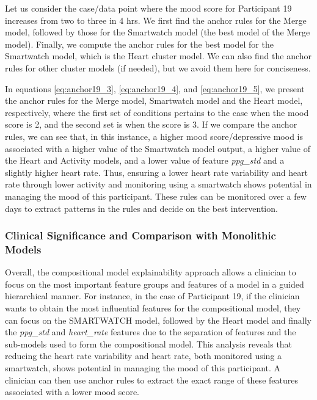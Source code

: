Let us consider the case/data point where the mood score for Participant 19 increases from two to three in 4 hrs. We first find the anchor rules for the Merge model, followed by those for the Smartwatch model (the best model of the Merge model). Finally, we compute the anchor rules for the best model for the Smartwatch model, which is the Heart cluster model. We can also find the anchor rules for other cluster models (if needed), but we avoid them here for conciseness. 

In equations \ref{eq:anchor19_3}, \ref{eq:anchor19_4}, and \ref{eq:anchor19_5}, we present the anchor rules for the Merge model, Smartwatch model and the Heart model, respectively, where the first set of conditions pertains to the case when the mood score is 2, and the second set is when the score is 3. If we compare the anchor rules, we can see that, in this instance, a higher mood score/depressive mood is associated with a higher value of the Smartwatch model output, a higher value of the Heart and Activity models, and a lower value of feature \emph{ppg\_std} and a slightly higher heart rate. Thus, ensuring a lower heart rate variability and heart rate through lower activity and monitoring using a smartwatch shows potential in managing the mood of this participant. These rules can be monitored over a few days to extract patterns in the rules and decide on the best intervention.


\subsubsection{Clinical Significance and Comparison with Monolithic Models}

Overall, the compositional model explainability approach allows a clinician to focus on the most important feature groups and features of a model in a guided hierarchical manner. For instance, in the case of Participant 19, if the clinician wants to obtain the most influential features for the compositional model, they can focus on the SMARTWATCH model, followed by the Heart model and finally the \emph{ppg\_std} and \emph{heart\_rate} features due to the separation of features and the sub-models used to form the compositional model. This analysis reveals that reducing the heart rate variability and heart rate, both monitored using a smartwatch, shows potential in managing the mood of this participant. A clinician can then use anchor rules to extract the exact range of these features associated with a lower mood score. 

